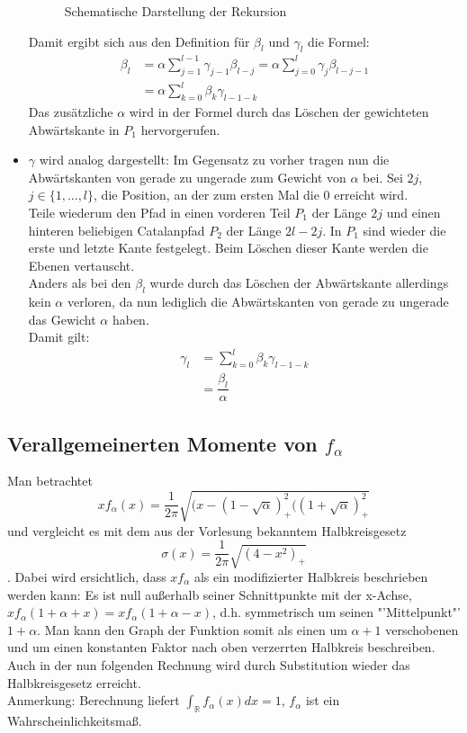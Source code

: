 \documentclass[a4paper, 11pt]{scrreprt}
\newcommand{\RR}{\mathbb{R}}
\begin{document}
\begin{itemize}
\begin{figure}[htpb]
	\caption{Schematische Darstellung der Rekursion}
\end{figure}
Damit ergibt sich aus den Definition für \(\beta_l\) und \(\gamma_l\) die Formel:
\begin{equation}
	\begin{split}
		\beta_l &= \alpha\sum_{j=1}^{l-1}\gamma_{j-1}\beta_{l-j} = \alpha\sum_{j=0}^l \gamma_j\beta_{l-j-1}\\
		&=\alpha\sum_{k=0}^l \beta_k\gamma_{l-1-k}
	\end{split}
\end{equation}
Das zusätzliche \(\alpha\) wird in der Formel durch das Löschen der gewichteten Abwärtskante in \(P_1\) hervorgerufen.\\


\item $ \gamma $ wird analog dargestellt: Im Gegensatz zu vorher tragen nun die Abwärtskanten von gerade zu ungerade zum Gewicht von $ \alpha $ bei. Sei \(2j\), \(j\in\{1,...,l\}\), die Position, an der zum ersten Mal die \(0\) erreicht wird. \\
Teile wiederum den Pfad in einen vorderen Teil \(P_1\) der Länge \(2j\) und einen hinteren beliebigen Catalanpfad \(P_2\) der Länge \(2l-2j\). In \(P_1\) sind wieder die erste und letzte Kante festgelegt. Beim Löschen dieser Kante werden die Ebenen vertauscht. \\
Anders als bei den $ \beta_l $ wurde durch das Löschen der Abwärtskante allerdings kein $ \alpha $ verloren, da nun lediglich die Abwärtskanten von gerade zu ungerade das Gewicht $ \alpha $ haben.\\ 
Damit gilt: 
\begin{equation}
	\begin{split}
		\gamma_l &=\sum_{k=0}^l \beta_k\gamma_{l-1-k} \\
		&= \dfrac{\beta_l}{\alpha}
	\end{split}
\end{equation}

\end{itemize}

\subsection*{Verallgemeinerten Momente von $ f_\alpha $}
Man betrachtet \[xf_{\alpha}(x)=\frac{1}{2\pi}\sqrt{(x-(1-\sqrt{\alpha})^2_{+}((1+\sqrt{\alpha})^2_{+}} \] und vergleicht es mit dem aus der Vorlesung bekanntem Halbkreisgesetz \[ \sigma(x)= \frac{1}{2 \pi} \sqrt{(4-x^2)_+}\].
Dabei wird ersichtlich, dass $ xf_\alpha $ als ein modifizierter Halbkreis beschrieben werden kann: Es ist null außerhalb seiner Schnittpunkte mit der x-Achse, $ xf_\alpha(1+\alpha +x)=xf_\alpha (1+\alpha -x) $, d.h. symmetrisch um seinen "'Mittelpunkt"' $ 1+\alpha $. Man kann den Graph der Funktion somit als einen um $ \alpha +1 $ verschobenen und um einen konstanten Faktor nach oben verzerrten Halbkreis beschreiben. Auch in der nun folgenden Rechnung wird durch Substitution wieder das Halbkreisgesetz erreicht. \\
Anmerkung: Berechnung liefert $ \int_{\RR} f_\alpha(x)dx=1 $, $ f_\alpha $ ist ein Wahrscheinlichkeitsmaß.\\
\end{document}
